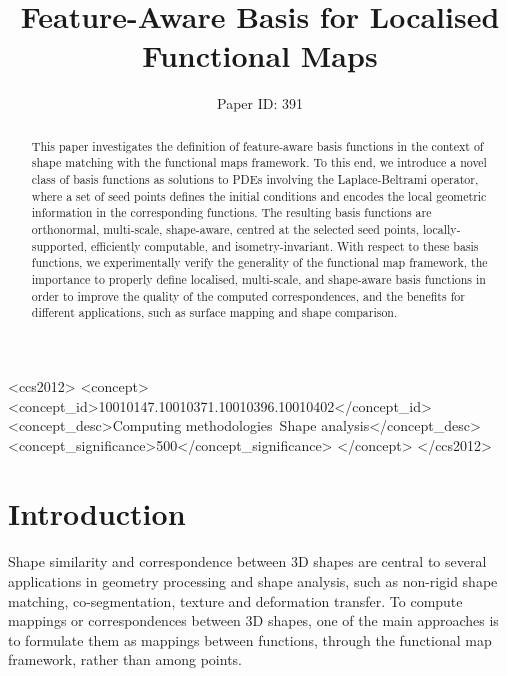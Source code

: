 \documentclass[acmtog,authorversion]{acmart}
\begin{document}
\title{Feature-Aware Basis for Localised Functional Maps}
\author{Paper ID: 391}


%
\begin{abstract}
This paper investigates the definition of feature-aware basis functions in the context of shape matching with the functional maps framework. To this end, we introduce a novel class of basis functions as solutions to PDEs involving the Laplace-Beltrami operator, where a set of seed points defines the initial conditions and encodes the local geometric information in the corresponding functions. The resulting basis functions are orthonormal, multi-scale, shape-aware, centred at the selected seed points, locally-supported, efficiently computable, and isometry-invariant. With respect to these basis functions, we experimentally verify the generality of the functional map framework, the importance to properly define localised, multi-scale, and shape-aware basis functions in order to improve the quality of the computed correspondences, and the benefits for different applications, such as surface mapping and shape comparison.
\end{abstract}
%
%
\begin{CCSXML}
<ccs2012>
<concept>
<concept_id>10010147.10010371.10010396.10010402</concept_id>
<concept_desc>Computing methodologies~Shape analysis</concept_desc>
<concept_significance>500</concept_significance>
</concept>
</ccs2012>
\end{CCSXML}
%
%
%
\maketitle
%
%
\section{Introduction\label{sec:INTRODUCTION}}
Shape similarity and correspondence between 3D shapes are central to several applications in geometry processing and shape analysis, such as non-rigid shape matching, co-segmentation, texture and deformation transfer. To compute mappings or correspondences between 3D shapes, one of the main approaches is to formulate them as mappings between functions, through the functional map framework, rather than among points.
\end{document}
